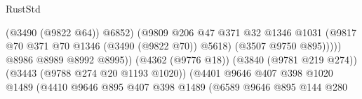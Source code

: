 \begin{lexlean}{RustStd}
\begin{coremodule}
{\begin{coremodule}
{{{{{{{{{{{{{{{{{{{{{{{{{{                                                            (@3490 (@9822 @64))
                                                            @6852)
                                                          (@9809
                                                            @206
                                                            @47
                                                            @371
                                                            @32
                                                            @1346
                                                            @1031
                                                            (@9817
                                                              @70
                                                              @371
                                                              @70
                                                              @1346
                                                              (@3490 (@9822 @70))
                                                              @5618)
                                                            (@3507 @9750 @895)))))
                                                    @8986
                                                    @8989
                                                    @8992
                                                    @8995))
                                                (@4362 (@9776 @18))
                                                (@3840 (@9781 @219 @274))
                                                (@3443 (@9788 @274 @20 @1193 @1020))
                                                (@4401
                                                  @9646
                                                  @407
                                                  @398
                                                  @1020
                                                  @1489
                                                  (@4410
                                                    @9646
                                                    @895
                                                    @407
                                                    @398
                                                    @1489
                                                    (@6589
                                                      @9646
                                                      @895
                                                      @144
                                                      @280
}}}}}}}}}}}}}}}}}}}}}}}}}}
\end{coremodule}}
\end{coremodule}
\end{lexlean}

